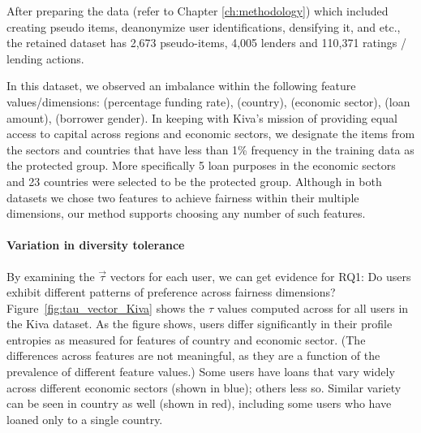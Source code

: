 
After preparing the data (refer to Chapter \ref{ch:methodology}) which included creating pseudo items, deanonymize user identifications, densifying it, and etc., the retained dataset has 2,673 pseudo-items, 4,005 lenders and 110,371 ratings / lending actions.

In this dataset, we observed an imbalance within the following feature values/dimensions: (percentage funding rate), (country), (economic sector), (loan amount), (borrower gender). In keeping with Kiva's mission of providing equal access to capital across regions and economic sectors, we designate the items from the sectors and countries that have less than 1\% frequency in the training data as the protected group. More specifically 5 loan purposes in the economic sectors and 23 countries were selected to be the protected group. 
Although in both datasets we chose two features to achieve fairness within their multiple dimensions, our method supports choosing any number of such features.

\noindent\paragraph{\textbf{Variation in diversity tolerance}}
\newline
\indent By examining the $\vec{\tau}$ vectors for each user, we can get evidence for RQ1: Do users exhibit different patterns of preference across fairness dimensions?
Figure~\ref{fig:tau_vector_Kiva} shows the $\tau$ values computed across for all users in the Kiva dataset. As the figure shows, users differ significantly in their profile entropies as measured for features of country and economic sector. (The differences across features are not meaningful, as they are a function of the prevalence of different feature values.) Some users have loans that vary widely across different economic sectors (shown in blue); others less so. Similar variety can be seen in country as well (shown in red), including some users who have loaned only to a single country.

